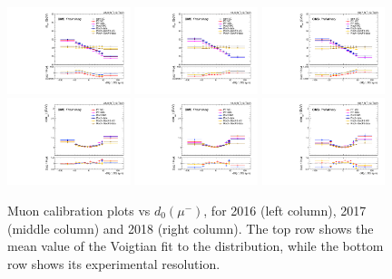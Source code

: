 \begin{figure}[!htb]
      \centering
      \includegraphics[width=0.32\textwidth]{pics/muon_corr/muon_cal/2016/muN_d0_rebin_summary_mean.pdf}
      \includegraphics[width=0.32\textwidth]{pics/muon_corr/muon_cal/2017/muN_d0_rebin_summary_mean.pdf}
      \includegraphics[width=0.32\textwidth]{pics/muon_corr/muon_cal/2018/muN_d0_rebin_summary_mean.pdf}
      \includegraphics[width=0.32\textwidth]{pics/muon_corr/muon_cal/2016/muN_d0_rebin_summary_reso.pdf}
      \includegraphics[width=0.32\textwidth]{pics/muon_corr/muon_cal/2017/muN_d0_rebin_summary_reso.pdf}
      \includegraphics[width=0.32\textwidth]{pics/muon_corr/muon_cal/2018/muN_d0_rebin_summary_reso.pdf}
      \caption{Muon calibration plots vs $d_0(\mu^{-})$, for 2016 (left column), 2017 (middle column) and 2018 (right column).
               The top row shows the mean value of the Voigtian fit to the \mmm distribution, 
               while the bottom row shows its experimental resolution.}
      \label{fig:mucal_muN_d0}
\end{figure}